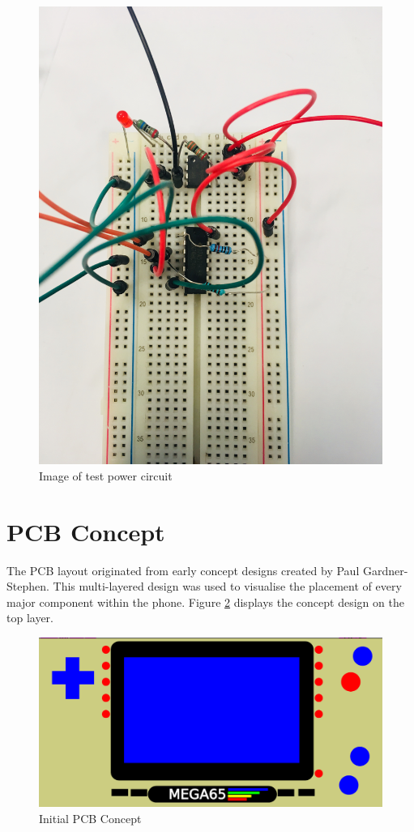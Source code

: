 \begin{figure}
	\includegraphics[width=0.5\linewidth]{Figures/powercircuit.jpg}\centering
	\caption{Image of test power circuit}
	\label{fig:power_circuit}
\end{figure}



\section{PCB Concept}
\label{chap6sec3}

The PCB layout originated from early concept designs created by Paul Gardner-Stephen. 
This multi-layered design was used to visualise the placement of every major component within the phone.
Figure \ref{fig:Concept} displays the concept design on the top layer. 

\begin{figure}
	\includegraphics[width=\linewidth]{Figures/handset-layout-v1.pdf}
	\caption{Initial PCB Concept}
	\label{fig:Concept}
\end{figure}


